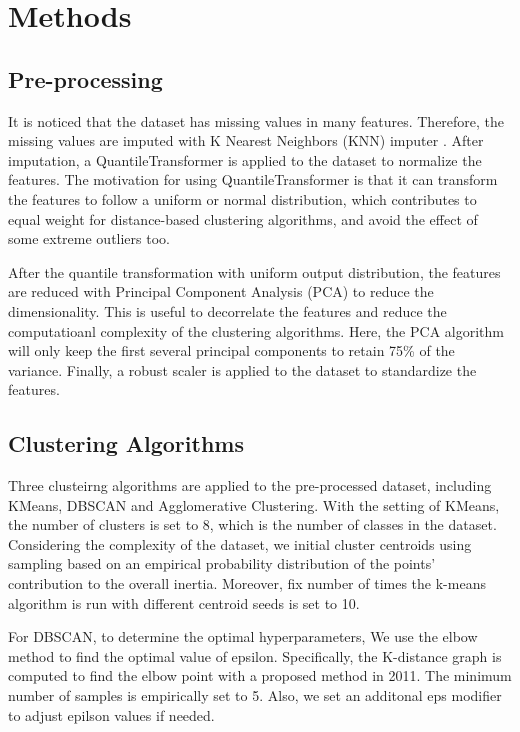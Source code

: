 \documentclass[12pt,a4paper]{article}
\begin{document}
\section{Methods}\label{sec:methods}
\subsection{Pre-processing}\label{subsec:preprocessing}
It is noticed that the dataset has missing values in many features. Therefore, the missing values are imputed with K Nearest Neighbors (KNN) imputer \cite{scikit-learn_KNNImputer}. 
After imputation, a QuantileTransformer \cite{scikit-learn_QuantileTransformer} is applied to the dataset to normalize the features. 
The motivation for using QuantileTransformer is that it can transform the features to follow a uniform or normal distribution, 
which contributes to equal weight for distance-based clustering algorithms, and avoid the effect of some extreme outliers too.

After the quantile transformation with uniform output distribution, the features are reduced with Principal Component Analysis (PCA) \cite{MACKIEWICZ1993303} to reduce the dimensionality. 
This is useful to decorrelate the features and reduce the computatioanl complexity of the clustering algorithms. Here, the PCA algorithm will only keep the first several principal components to retain 75\% of the variance. 
Finally, a robust scaler \cite{scikit-learn_RobustScaler} is applied to the dataset to standardize the features.

\subsection{Clustering Algorithms}\label{subsec:clustering}
Three clusteirng algorithms are applied to the pre-processed dataset, including KMeans, DBSCAN and Agglomerative Clustering. 
With the setting of KMeans, the number of clusters is set to 8, which is the number of classes in the dataset. Considering the complexity of the dataset, we initial cluster centroids using sampling based on an empirical probability distribution of the points' contribution to the overall inertia. 
Moreover, fix number of times the k-means algorithm is run with different centroid seeds is set to 10.

For DBSCAN, to determine the optimal hyperparameters, We use the elbow method to find the optimal value of epsilon. Specifically, the K-distance graph is computed to find the elbow point with a proposed method \cite{Kdistance} in 2011. 
The minimum number of samples is empirically set to 5. Also, we set an additonal eps modifier to adjust epilson values if needed.
\end{document}
